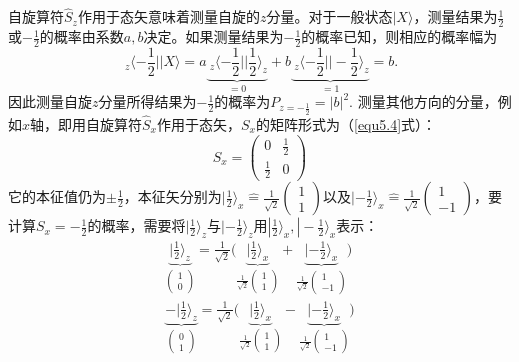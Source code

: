 自旋算符$\hat{S}_z$作用于态矢意味着测量自旋的$z$分量。对于一般状态$|X \rangle$，测量结果为$\frac{1}{2}$或$-\frac{1}{2}$的概率由系数$a, b$决定。如果测量结果为$-\frac{1}{2}$的概率已知，则相应的概率幅为
\begin{equation}
	\ _z\langle -\frac{1}{2} || X \rangle = a\underbrace{ \ _z\langle -\frac{1}{2} || \frac{1}{2} \rangle_z }_{ = 0} + b \underbrace{ \ _z \langle -\frac{1}{2} || -\frac{1}{2} \rangle_z }_{=1} = b.
\label{equ8.49}
\end{equation}
因此测量自旋$z$分量所得结果为$-\frac{1}{2}$的概率为$P_{z = -\frac{1}{2}} = |b|^2$. 测量其他方向的分量，例如$x$轴，即用自旋算符$\hat{S}_x$作用于态矢，$S_x$的矩阵形式为（\eqref{equ5.4}式）：
\begin{equation}
	S_x = 
		\begin{pmatrix}
			0 & \frac{1}{2} \\
			\frac{1}{2} & 0
		\end{pmatrix}
\label{equ8.50}
\end{equation}
它的本征值仍为$\pm \frac{1}{2}$，本征矢分别为$|\frac{1}{2} \rangle_x \hat{=} \frac{1}{\sqrt{2}} \begin{pmatrix} 1 \\ 1 \end{pmatrix}$以及$|-\frac{1}{2} \rangle_x \hat{=} \frac{1}{\sqrt{2}} \begin{pmatrix} 1 \\ -1 \end{pmatrix}$，要计算$S_x = -\frac{1}{2}$的概率，需要将$|\frac{1}{2} \rangle_z$与$|-\frac{1}{2} \rangle_z$用$|\frac{1}{2} \rangle_x, |-\frac{1}{2} \rangle_x$表示：
\begin{align}
	\underbrace{|\frac{1}{2} \rangle_z}_{\begin{pmatrix} 1 \\ 0 \end{pmatrix} } = \frac{1}{\sqrt{2}} \Big( \underbrace{ |\frac{1}{2} \rangle_x }_{ \frac{1}{\sqrt{2}} \begin{pmatrix} 1 \\ 1 \end{pmatrix} } + \underbrace{ |-\frac{1}{2} \rangle_x}_{\frac{1}{\sqrt{2}} \begin{pmatrix} 1 \\ -1 \end{pmatrix} } \Big)
\label{equ8.51} \\
	\underbrace{-|\frac{1}{2} \rangle_z}_{\begin{pmatrix} 0 \\ 1 \end{pmatrix} } = \frac{1}{\sqrt{2}} \Big( \underbrace{ |\frac{1}{2} \rangle_x }_{ \frac{1}{\sqrt{2}} \begin{pmatrix} 1 \\ 1 \end{pmatrix} } - \underbrace{ |-\frac{1}{2} \rangle_x}_{\frac{1}{\sqrt{2}} \begin{pmatrix} 1 \\ -1 \end{pmatrix} } \Big)
\label{equ8.52}
\end{align}
